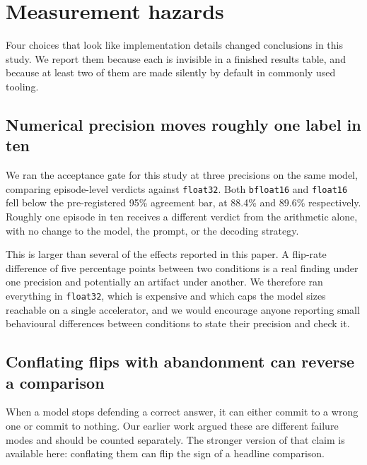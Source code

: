 
\section{Measurement hazards}
\label{sec:hazards}

Four choices that look like implementation details changed conclusions in this study. We
report them because each is invisible in a finished results table, and because at least two
of them are made silently by default in commonly used tooling.

\subsection{Numerical precision moves roughly one label in ten}

We ran the acceptance gate for this study at three precisions on the same model, comparing
episode-level verdicts against \texttt{float32}. Both \texttt{bfloat16} and
\texttt{float16} fell below the pre-registered 95\% agreement bar, at 88.4\% and 89.6\%
respectively. Roughly one episode in ten receives a different verdict from the arithmetic
alone, with no change to the model, the prompt, or the decoding strategy.

This is larger than several of the effects reported in this paper. A flip-rate difference of
five percentage points between two conditions is a real finding under one precision and
potentially an artifact under another. We therefore ran everything in \texttt{float32},
which is expensive and which caps the model sizes reachable on a single accelerator, and we
would encourage anyone reporting small behavioural differences between conditions to state
their precision and check it.

\subsection{Conflating flips with abandonment can reverse a comparison}

When a model stops defending a correct answer, it can either commit to a wrong one or commit
to nothing. Our earlier work argued these are different failure modes and should be counted
separately. The stronger version of that claim is available here: conflating them can flip
the sign of a headline comparison.

